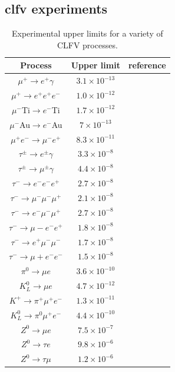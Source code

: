 \begin{refsection}
    \subsection{\gls{clfv} experiments}
        \begin{table}
            \centering
            \begin{tabular}{c|c|c}
            \hline
            Process & Upper limit & reference\\
            \hline
            \hline
            $\mu^+\rightarrow e^+\gamma$ & $3.1\times 10^{-13}$ & \cite{MEG_II:physics}\\
            $\mu^+\rightarrow e^+e^+e^-$ & $1.0\times 10^{-12}$ & \cite{SINDRUM}\\
            $\mu^-$Ti$\rightarrow e^-$Ti  & $1.7\times 10^{-12}$ & \cite{SINDRUM}\\
            $\mu^-$Au$\rightarrow e^-$Au  & $7\times 10^{-13}$   & \cite{Bertl}\\
            $\mu^+e^-\rightarrow \mu^-e^+$ & $8.3\times 10^{-11}$ & \cite{Willmann}\\
            $\tau^\pm\rightarrow e^\pm\gamma$ & $3.3\times 10^{-8}$ & \cite{Aubert}\\
            $\tau^\pm\rightarrow \mu^\pm\gamma$ & $4.4\times 10^{-8}$ & \cite{Aubert}\\
            $\tau^-\rightarrow e^-e^-e^+$ & $2.7\times 10^{-8}$ & \cite{Hayasaka}\\
            $\tau^-\rightarrow \mu^-\mu^-\mu^+$ & $2.1\times 10^{-8}$ & \cite{Hayasaka}\\
            $\tau^-\rightarrow e^-\mu^-\mu^+$ & $2.7\times 10^{-8}$ & \cite{Hayasaka}\\
            $\tau^-\rightarrow \mu-e^-e^+$ & $1.8\times 10^{-8}$ & \cite{Hayasaka}\\
            $\tau^-\rightarrow e^+\mu^-\mu^-$ & $1.7\times 10^{-8}$ & \cite{Hayasaka}\\
            $\tau^-\rightarrow \mu+e^-e^-$ & $1.5\times 10^{-8}$ & \cite{Hayasaka}\\
            $\pi^0\rightarrow \mu e$ & $3.6\times 10^{-10}$ & \cite{Abouzaid}\\
            $K^0_L\rightarrow \mu e$ & $4.7\times 10^{-12}$ & \cite{Ambrose}\\
            $K^+\rightarrow \pi^+\mu^+e^-$ & $1.3\times 10^{-11}$ & \cite{Sher}\\
            $K^0_L\rightarrow \pi^0\mu^+e^-$ & $4.4\times 10^{-10}$ & \cite{Abouzaid}\\
            $Z^0\rightarrow \mu e$ & $7.5\times10^{-7}$& \cite{Aad}\\
            $Z^0\rightarrow \tau e$ & $9.8\times10^{-6}$& \cite{Akers} \\
            $Z^0\rightarrow \tau \mu$ & $1.2\times10^{-6}$& \cite{Akers}\\
            \hline
            \end{tabular}
            \caption[Limits for CLFV processes]{Experimental upper limits for a variety of CLFV processes.}
        \label{T_CLFV}
        \end{table}
        

\end{refsection}
